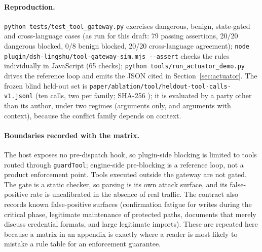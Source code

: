 \paragraph{Reproduction.} \texttt{python tests/\allowbreak{}test\_\allowbreak{}tool\_\allowbreak{}gateway.\allowbreak{}py} exercises
dangerous, benign, state-gated and cross-language cases (as run for this draft:
79 passing assertions, 20/20 dangerous blocked, 0/8 benign blocked, 20/20
cross-language agreement);
\texttt{node plugin/\allowbreak{}dsh-\allowbreak{}lingshu/\allowbreak{}tool-\allowbreak{}gateway-\allowbreak{}sim.\allowbreak{}mjs -\allowbreak{}-\allowbreak{}assert} checks the rules
individually in JavaScript (65 checks);
\texttt{python tools/\allowbreak{}run\_\allowbreak{}actuator\_\allowbreak{}demo.\allowbreak{}py} drives the reference loop and emits
the JSON cited in Section~\ref{sec:actuator}. The frozen blind held-out set is
\texttt{paper/\allowbreak{}ablation/\allowbreak{}tool/\allowbreak{}heldout-\allowbreak{}tool-\allowbreak{}calls-\allowbreak{}v1.\allowbreak{}jsonl} (ten calls, two per
family; SHA-256
\texttt{}); it
is evaluated by a party other than its author, under two regimes (arguments
only, and arguments with context), because the conflict family depends on
context.

\paragraph{Boundaries recorded with the matrix.} The host exposes no
pre-dispatch hook, so plugin-side blocking is limited to tools routed through
\texttt{guardTool}; engine-side pre-blocking is a reference loop, not a product
enforcement point. Tools executed outside the gateway are not gated. The gate is
a static checker, so parsing is its own attack surface, and its false-positive
rate is uncalibrated in the absence of real traffic. The contract also records
known false-positive surfaces (confirmation fatigue for writes during the
critical phase, legitimate maintenance of protected paths, documents that merely
discuss credential formats, and large legitimate imports). These are repeated
here because a matrix in an appendix is exactly where a reader is most likely to
mistake a rule table for an enforcement guarantee.
